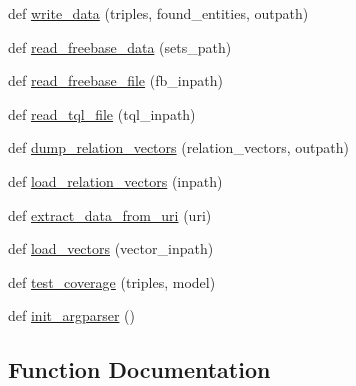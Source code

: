 \begin{DoxyCompactItemize}
\item 
def \hyperlink{namespacesrc_1_1guesser_1_1svm__guesser_a60328a23b11cb5ea2fc6deef915b6b89}{write\+\_\+data} (triples, found\+\_\+entities, outpath)
\item 
def \hyperlink{namespacesrc_1_1guesser_1_1svm__guesser_a57c8a51581590ac0df4a7d07a27893a6}{read\+\_\+freebase\+\_\+data} (sets\+\_\+path)
\item 
def \hyperlink{namespacesrc_1_1guesser_1_1svm__guesser_aeb0faa67c606038dc3936ee21db34b03}{read\+\_\+freebase\+\_\+file} (fb\+\_\+inpath)
\item 
def \hyperlink{namespacesrc_1_1guesser_1_1svm__guesser_a07427a8ed0aa8653f8b8faa8fa6f65b5}{read\+\_\+tql\+\_\+file} (tql\+\_\+inpath)
\item 
def \hyperlink{namespacesrc_1_1guesser_1_1svm__guesser_ab43ef3856a80d03d726fc97c7eba5a5a}{dump\+\_\+relation\+\_\+vectors} (relation\+\_\+vectors, outpath)
\item 
def \hyperlink{namespacesrc_1_1guesser_1_1svm__guesser_aa586eda223e1a50888189e88ed336b3d}{load\+\_\+relation\+\_\+vectors} (inpath)
\item 
def \hyperlink{namespacesrc_1_1guesser_1_1svm__guesser_a5335bd9495e295ec86423beefbc2a68c}{extract\+\_\+data\+\_\+from\+\_\+uri} (uri)
\item 
def \hyperlink{namespacesrc_1_1guesser_1_1svm__guesser_a55c25b5867e19727ecb4c85dc9938b28}{load\+\_\+vectors} (vector\+\_\+inpath)
\item 
def \hyperlink{namespacesrc_1_1guesser_1_1svm__guesser_aefd5d7ca30dac6b94741b216cfbf1158}{test\+\_\+coverage} (triples, model)
\item 
def \hyperlink{namespacesrc_1_1guesser_1_1svm__guesser_a4f13054de0895427b58bc846df322d97}{init\+\_\+argparser} ()
\end{DoxyCompactItemize}


\subsection{Function Documentation}
